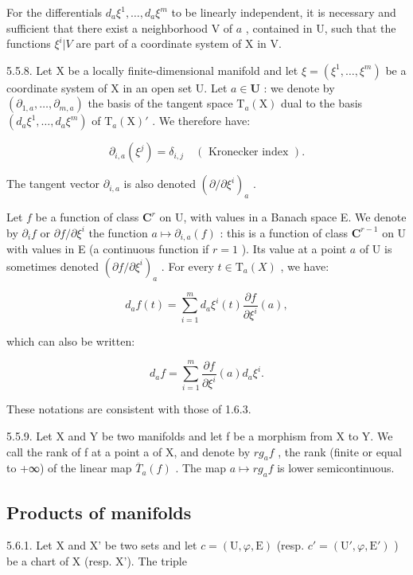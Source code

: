 For the differentials \(d_{a}\xi^{1},\ldots,d_{a}\xi^{m}\) to be linearly independent, it is necessary and sufficient that there exist a neighborhood V of \(a\) , contained in U, such that the functions \(\xi^{i}|V\) are part of a coordinate system of X in V.

5.5.8. Let X be a locally finite-dimensional manifold and let \(\xi = (\xi^1, \ldots, \xi^m)\) be a coordinate system of X in an open set U. Let \(a \in \mathbf{U}\) : we denote by \((\partial_{1,a}, \ldots, \partial_{m,a})\) the basis of the tangent space \(\mathrm{T}_a(\mathrm{X})\) dual to the basis \((d_a\xi^1, \ldots, d_a\xi^m)\) of \(\mathrm{T}_a(\mathrm{X})'\) . We therefore have:

\[
\partial_ {i, a} (\xi^ {j}) = \delta_ {i, j} \quad (\text { Kronecker index }).
\]

The tangent vector \(\partial_{i,a}\) is also denoted \((\partial/\partial\xi^{i})_{a}\) .

Let \(f\) be a function of class \(\mathbf{C}^r\) on U, with values in a Banach space E. We denote by \(\partial_i f\) or \(\partial f / \partial \xi^i\) the function \(a \mapsto \partial_{i,a}(f)\) : this is a function of class \(\mathbf{C}^{r-1}\) on U with values in E (a continuous function if \(r = 1\) ). Its value at a point \(a\) of U is sometimes denoted \((\partial f / \partial \xi^i)_a\) . For every \(t \in \mathrm{T}_a(X)\) , we have:

\[
d _ {a} f (t) = \sum_ {i = 1} ^ {m} d _ {a} \xi^ {i} (t) \frac {\partial f}{\partial \xi^ {i}} (a),
\]

which can also be written:

\[
d _ {a} f = \sum_ {i = 1} ^ {m} \frac {\partial f}{\partial \xi^ {i}} (a) d _ {a} \xi^ {i}.
\]

These notations are consistent with those of 1.6.3.

5.5.9. Let X and Y be two manifolds and let f be a morphism from X to Y. We call the rank of f at a point a of X, and denote by \(rg_{a}f\) , the rank (finite or equal to +∞) of the linear map \(\overline{T}_{a}(f)\) . The map \(a \mapsto rg_{a}f\) is lower semicontinuous.

\subsection{Products of manifolds}

5.6.1. Let X and X' be two sets and let \(c = (\mathrm{U}, \varphi, \mathrm{E})\) (resp. \(c' = (\mathrm{U}', \varphi, \mathrm{E}')\) ) be a chart of X (resp. X'). The triple

